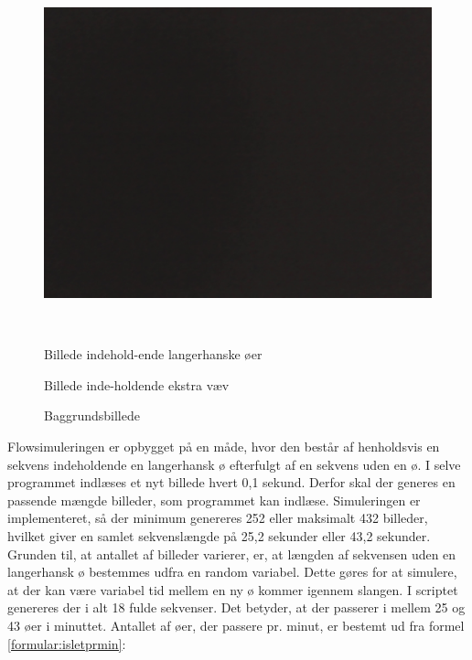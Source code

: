 \begin{figure}[H]
\begin{minipage}[b]{0.3\textwidth}
\includegraphics[width=1.00\textwidth]{billeder/software/3.jpg} %
\end{minipage} \\  %
\begin{minipage}[t]{0.3\textwidth}
\caption{Billede indehold-ende langerhanske øer} %
\label{fig:img1}
\end{minipage} \hfill
\begin{minipage}[t]{0.3\textwidth}
\caption{Billede inde-holdende ekstra væv} %
\label{fig:img2}
\end{minipage}
\hfill
\begin{minipage}[t]{0.3\textwidth}
\caption{Baggrundsbillede} %
\label{fig:img3}
\end{minipage}
\end{figure}
Flowsimuleringen er opbygget på en måde, hvor den består af henholdsvis en sekvens indeholdende en langerhansk ø efterfulgt af en sekvens uden en ø. I selve programmet indlæses et nyt billede hvert 0,1 sekund. Derfor skal der generes en passende mængde billeder, som programmet kan indlæse. Simuleringen er implementeret, så der minimum genereres 252 eller maksimalt 432 billeder, hvilket giver en samlet sekvenslængde på 25,2 sekunder eller 43,2 sekunder. Grunden til, at antallet af billeder varierer, er, at længden af sekvensen uden en langerhansk ø bestemmes udfra en random variabel. Dette gøres for at simulere, at der kan være variabel tid mellem en ny ø kommer igennem slangen. I scriptet genereres der i alt 18 fulde sekvenser. Det betyder, at der passerer i mellem 25 og 43 øer i minuttet. Antallet af øer, der passere pr. minut, er bestemt ud fra formel \ref{formular:isletprmin}: 
